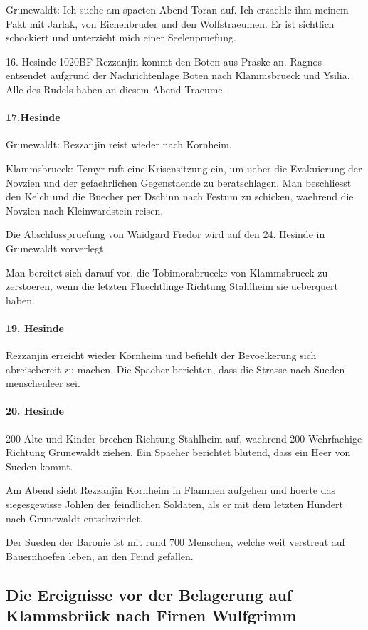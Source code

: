 Grunewaldt:
Ich suche am spaeten Abend Toran auf. Ich erzaehle ihm meinem Pakt mit Jarlak, von Eichenbruder und den Wolfstraeumen. Er ist sichtlich schockiert und unterzieht mich einer Seelenpruefung.

16. Hesinde 1020BF
Rezzanjin kommt den Boten aus Praske an. Ragnos entsendet aufgrund der Nachrichtenlage Boten nach Klammsbrueck und Ysilia. Alle des Rudels haben an diesem Abend Traeume.

\paragraph{17.Hesinde}
Grunewaldt:
Rezzanjin reist wieder nach Kornheim.

Klammsbrueck:
Temyr ruft eine Krisensitzung ein, um ueber die Evakuierung der Novzien und der gefaehrlichen Gegenstaende zu beratschlagen. Man beschliesst den Kelch und die Buecher per Dschinn nach Festum zu schicken, waehrend die Novzien nach Kleinwardstein reisen.

Die Abschlusspruefung von Waidgard Fredor wird auf den 24. Hesinde in Grunewaldt vorverlegt.

Man bereitet sich darauf vor, die Tobimorabruecke von Klammsbrueck zu zerstoeren, wenn die letzten Fluechtlinge Richtung Stahlheim sie ueberquert haben.

\paragraph{19. Hesinde}
Rezzanjin erreicht wieder Kornheim und befiehlt der Bevoelkerung sich abreisebereit zu machen. Die Spaeher berichten, dass die Strasse nach Sueden menschenleer sei.

\paragraph{20. Hesinde}
200 Alte und Kinder brechen Richtung Stahlheim auf, waehrend 200 Wehrfaehige Richtung Grunewaldt ziehen. Ein Spaeher berichtet blutend, dass ein Heer von Sueden kommt.

Am Abend sieht Rezzanjin Kornheim in Flammen aufgehen und hoerte das siegesgewisse Johlen der feindlichen Soldaten, als er mit dem letzten Hundert nach Grunewaldt entschwindet.

Der Sueden der Baronie ist mit rund 700 Menschen, welche weit verstreut auf Bauernhoefen leben, an den Feind gefallen.

\subsection{Die Ereignisse vor der Belagerung auf Klammsbrück nach Firnen Wulfgrimm}

